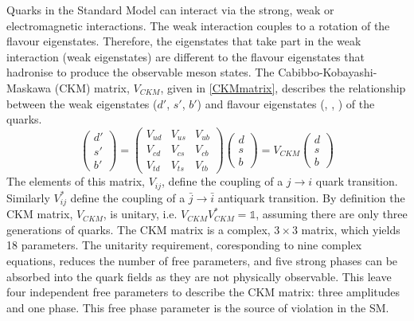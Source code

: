 Quarks in the Standard Model can interact via the strong, weak or electromagnetic interactions. The weak interaction couples to a rotation of the flavour eigenstates.
Therefore, the eigenstates that take part in the weak interaction (weak eigenstates) are different to the flavour eigenstates that hadronise to produce the observable meson states. The Cabibbo-Kobayashi-Maskawa (CKM) matrix, $V_{CKM}$, given in \eqn \ref{CKMmatrix}, describes the relationship between the weak eigenstates ($d'$, $s'$, $b'$) and flavour eigenstates (\dquark, \squark, \bquark) of the quarks. 
\begin{equation}
\left(
\begin{array}{c} d' \\ s' \\ b'  \end{array} \right) =
\begin{pmatrix} V_{ud} & V_{us} & V_{ub} \\ V_{cd} & V_{cs} & V_{cb} \\ V_{td} & V_{ts} & V_{tb} \end{pmatrix} \left( 
\begin{array}{c} d \\ s \\ b \end{array} \right) =
V_{CKM} \left( \begin{array}{c} d \\ s \\ b \end{array} \right)
\label{CKMmatrix}
\end{equation}
The elements of this matrix, $V_{ij}$, define the coupling of a $j \to i$ quark transition. Similarly $V_{ij}^*$ define the coupling of a $\bar{j} \to \bar{i}$ antiquark transition. By definition the CKM matrix, $V_{CKM}$, is unitary, i.e. $V_{CKM}V_{CKM}^* = \mathds{1}$, assuming there are only three generations of quarks. The CKM matrix is a complex, $3 \times 3$ matrix, which yields 18 parameters. The unitarity requirement, coresponding to nine complex equations, reduces the number of free parameters, and five strong phases can be absorbed into the quark fields as they are not physically observable. This leave four independent free parameters to describe the CKM matrix: three amplitudes and one phase. This free phase parameter is the source of \CP violation in the SM. 

